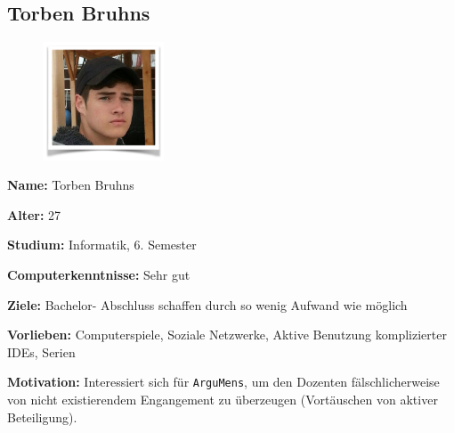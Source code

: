 \subsection{Torben Bruhns}

\begin{figure}
  \vspace{-20pt}
  \begin{center}
    \includegraphics[width=0.32\textwidth]{./images/Torben_Bruhns}
  \end{center}
  \vspace{-40pt}
\end{figure}

\textbf{Name:} Torben Bruhns

\textbf{Alter:} 27

\textbf{Studium:} Informatik, 6. Semester

\textbf{Computerkenntnisse:} Sehr gut

\textbf{Ziele:} Bachelor- Abschluss schaffen durch so wenig Aufwand wie möglich 

\textbf{Vorlieben:} Computerspiele, Soziale Netzwerke, Aktive Benutzung komplizierter IDEs, Serien

\textbf{Motivation:} Interessiert sich für \texttt{ArguMens}, um den Dozenten fälschlicherweise von nicht existierendem Engangement zu überzeugen (Vortäuschen von aktiver Beteiligung).


